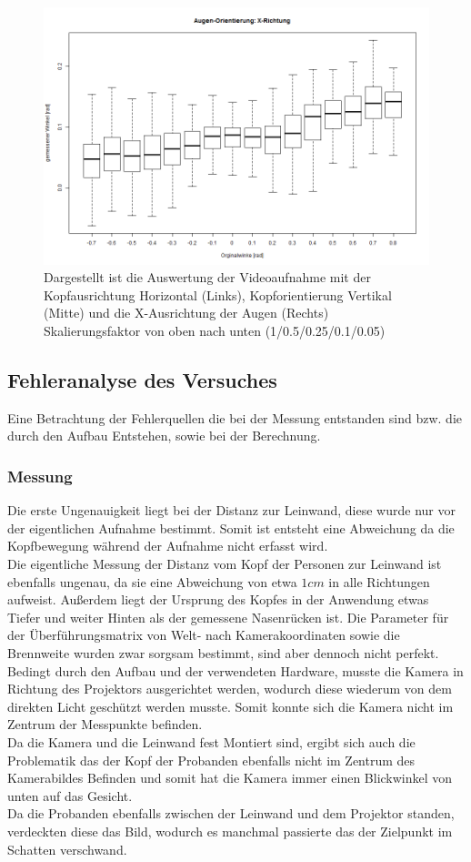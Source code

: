 \begin{figure}
	\includegraphics[width=0.3\linewidth]{OpenFace_Img/EyeAVG_x_S005}
	\caption{Dargestellt ist die Auswertung der Videoaufnahme mit der Kopfausrichtung Horizontal (Links), Kopforientierung Vertikal (Mitte) und die X-Ausrichtung der Augen (Rechts)\\Skalierungsfaktor von oben nach unten (1/0.5/0.25/0.1/0.05)}
	\label{graph_VideoSkalierung}
\end{figure}
\subsection{Fehleranalyse des Versuches}
Eine Betrachtung der Fehlerquellen die bei der Messung entstanden sind bzw. die durch den Aufbau Entstehen, sowie bei der Berechnung.
\subsubsection{Messung}
Die erste Ungenauigkeit liegt bei der Distanz zur Leinwand, diese wurde nur vor der eigentlichen Aufnahme bestimmt. Somit ist entsteht eine Abweichung da die Kopfbewegung während der Aufnahme nicht erfasst wird.\\
Die eigentliche Messung der Distanz  vom Kopf der Personen zur Leinwand ist ebenfalls ungenau, da sie eine Abweichung von etwa $1cm$ in alle Richtungen aufweist. Außerdem liegt der Ursprung des Kopfes in der Anwendung etwas Tiefer und weiter Hinten als der gemessene Nasenrücken ist.
Die Parameter für der Überführungsmatrix von Welt- nach Kamerakoordinaten sowie die Brennweite wurden zwar sorgsam bestimmt, sind aber dennoch nicht perfekt.\\
Bedingt durch den Aufbau und der verwendeten Hardware, musste die Kamera in Richtung des Projektors ausgerichtet werden, wodurch diese wiederum von dem direkten Licht geschützt werden musste. Somit konnte sich die Kamera nicht im Zentrum der Messpunkte befinden.\\
Da die Kamera und die Leinwand fest Montiert sind, ergibt sich auch die Problematik das der Kopf der Probanden ebenfalls nicht im Zentrum des Kamerabildes Befinden und somit hat die Kamera immer einen  Blickwinkel von unten auf das Gesicht.\\
Da die Probanden ebenfalls zwischen der Leinwand und dem Projektor standen, verdeckten diese das Bild, wodurch es manchmal passierte das der Zielpunkt im Schatten verschwand.
